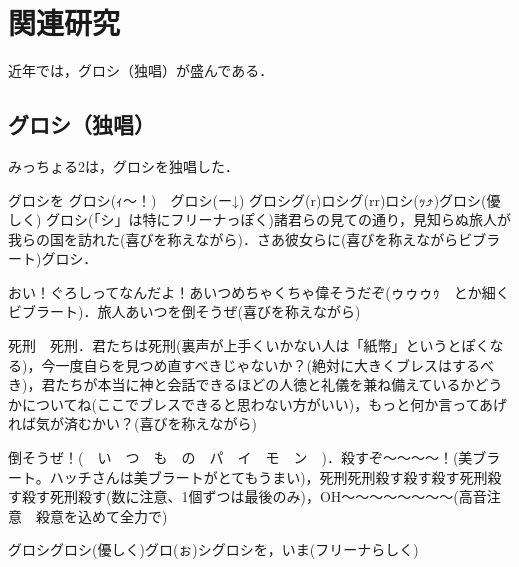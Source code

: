 \documentclass[main]{subfiles}
\begin{document}
\chapter{関連研究}

近年では，グロシ（独唱）が盛んである\cite{Rao:AMCQG_Survey}．

\section{グロシ（独唱）}
みっちょる2は，グロシを独唱した\cite{9964056}．

グロシを グロシ(ｨ〜！)　グロシ(ー↓) グロシグ(r)ロシグ(rr)ロシ(ｯ︎⤴️)グロシ(優しく) グロシ(「シ」は特にフリーナっぽく)諸君らの見ての通り，見知らぬ旅人が我らの国を訪れた(喜びを称えながら)．さあ彼女らに(喜びを称えながらビブラート)グロシ．

おい！ぐろしってなんだよ！あいつめちゃくちゃ偉そうだぞ(ゥゥゥｩ　とか細くビブラート)．旅人あいつを倒そうぜ(喜びを称えながら)

死刑　死刑．君たちは死刑(裏声が上手くいかない人は「紙幣」というとぽくなる)，今一度自らを見つめ直すべきじゃないか？(絶対に大きくブレスはするべき)，君たちが本当に神と会話できるほどの人徳と礼儀を兼ね備えているかどうかについてね(ここでブレスできると思わない方がいい)，もっと何か言ってあげれば気が済むかい？(喜びを称えながら)

倒そうぜ！(　い　つ　も　の　パ　イ　モ　ン　)．殺すぞ〜〜〜〜！(美ブラート。ハッチさんは美ブラートがとてもうまい)，死刑死刑殺す殺す殺す死刑殺す殺す死刑殺す(数に注意、1個ずつは最後のみ)，OH〜〜〜〜〜〜〜〜(高音注意　殺意を込めて全力で)

グロシグロシ(優しく)グロ(ぉ)シグロシを，いま(フリーナらしく)
\end{document}
